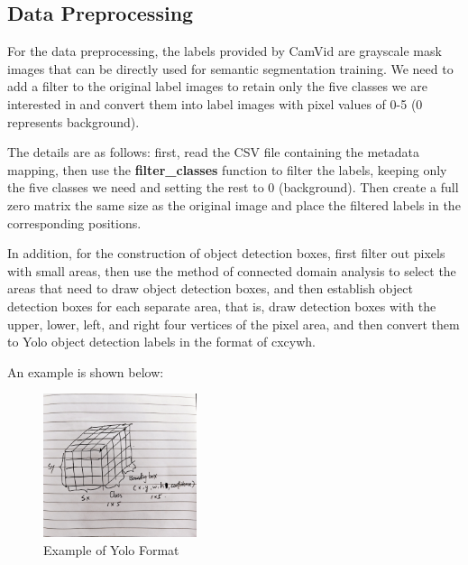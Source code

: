 \documentclass[conference]{IEEEtran}
\begin{document}
\subsection{Data Preprocessing}


For the data preprocessing, the labels provided by CamVid are grayscale mask images that can be directly used for semantic segmentation training. We need to add a filter to the original label images to retain only the five classes we are interested in and convert them into label images with pixel values of 0-5 (0 represents background).

The details are as follows: first, read the CSV file containing the metadata mapping, then use the \textbf{filter\_classes} function to filter the labels, keeping only the five classes we need and setting the rest to 0 (background). Then create a full zero matrix the same size as the original image and place the filtered labels in the corresponding positions.


In addition, for the construction of object detection boxes, first filter out pixels with small areas, then use the method of connected domain analysis to select the areas that need to draw object detection boxes, and then establish object detection boxes for each separate area, that is, draw detection boxes with the upper, lower, left, and right four vertices of the pixel area, and then convert them to Yolo object detection labels in the format of cxcywh.


An example is shown below:
\begin{figure}[htbp]
    \centerline{\includegraphics[width=0.4\textwidth]{fig/yolo_format.jpg}}
    \caption{Example of Yolo Format}
    \label{fig:format}
\end{figure}
\end{document}
